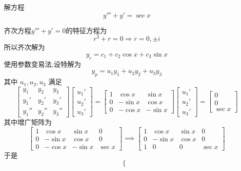 \begin{questions}
    \question 解方程
    \[
    y'''+y' = \sec x
    \]
    \begin{solution}
        齐次方程$y'''+y'=0$的特征方程为
        \[
        r^3 + r = 0 \Rightarrow r = 0, \pm i
        \]
        所以齐次解为
        \[
        y_c = c_1 + c_2 \cos x + c_3 \sin x
        \]
        使用参数变易法,设特解为
        \[
        y_p = u_1 y_1 + u_2 y_2 + u_3 y_3
        \]
        其中 \(u_1, u_2, u_3\) 满足
        \[
        \begin{bmatrix}
        y_1 & y_2 & y_3 \\
        y_1' & y_2' & y_3' \\
        y_1'' & y_2'' & y_3''
        \end{bmatrix}
        \begin{bmatrix}
        u_1' \\ u_2' \\ u_3'
        \end{bmatrix}
        =
        \begin{bmatrix}
        1 & \cos x & \sin x \\
        0 & -\sin x & \cos x \\
        0 & -\cos x & -\sin x
        \end{bmatrix}
        \begin{bmatrix}
        u_1' \\ u_2' \\ u_3'
        \end{bmatrix}
        =
        \begin{bmatrix}
        0 \\ 0 \\ \sec x
        \end{bmatrix}
        \]
        其中增广矩阵为
        \[
        \left[
        \begin{array}{ccc|c}
        1 & \cos x & \sin x & 0 \\
        0 & -\sin x & \cos x & 0 \\
        0 & -\cos x & -\sin x & \sec x
        \end{array}
        \right]
        \implies
        \left[
        \begin{array}{ccc|c}
        1 & \cos x & \sin x & 0 \\
        0 & -\sin x & \cos x & 0 \\
        1 & 0 & 0 & \sec x
        \end{array}
        \right]
        \]
        于是
        \[
        \begin{cases}

\end{cases}\]
\end{solution}
\end{questions}
